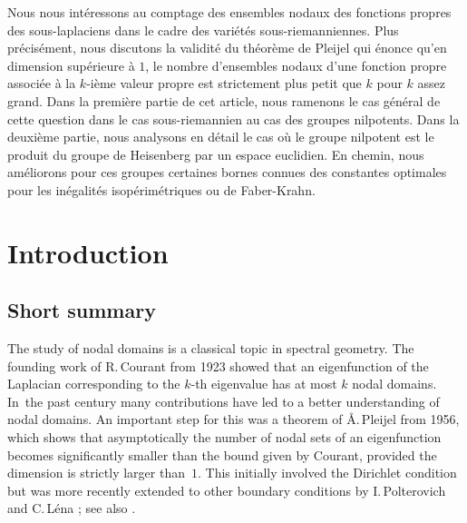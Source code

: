 \documentclass[JEP,XML,SOM,Unicode,published]{cedram}
\theoremstyle{definition}
\newcommand{\1}{\mathbbm{1}}
\begin{document}


\begin{altabstract}
Nous nous intéressons au comptage des ensembles nodaux des fonctions propres des sous-laplaciens dans le cadre des variétés sous-riemanniennes. Plus précisément, nous discutons la validité du théorème de Pleijel qui énonce qu'en dimension supérieure à $1$, le nombre d'ensembles nodaux d'une fonction propre associée à la $k$-ième valeur propre est strictement plus petit que $k$ pour $k$ assez grand.
Dans la première partie de cet article, nous ramenons le cas général de cette question dans le cas sous-riemannien au cas des groupes nilpotents.
Dans la deuxième partie, nous analysons en détail le cas où le groupe nilpotent est le produit du groupe de Heisenberg par un espace euclidien. En chemin, nous améliorons pour ces groupes certaines bornes connues des constantes optimales pour les inégalités isopérimétriques ou de Faber-Krahn.
\end{altabstract}

\maketitle
\vspace*{-\baselineskip}
\tableofcontents
\mainmatter

\vspace*{-3\baselineskip}
\mbox{}
\section{Introduction}\label{s0}

\subsection{Short summary}
The study of nodal domains is a classical topic in spectral geometry. The founding work of R.\,Courant \cite{CH} from 1923 showed that an eigenfunction of the Laplacian corresponding to the $k$-th eigenvalue has at most $k$ nodal domains. In~the past century many contributions have led to a better understanding of nodal domains. An important step for this was a theorem of \AA.\,Pleijel \cite{Pl} from 1956, which shows that asymptotically the number of nodal sets of an eigenfunction becomes significantly smaller than the bound given by Courant, provided the dimension is strictly larger than~$1$. This initially involved the Dirichlet condition but was more recently extended to other boundary conditions by I.\,Polterovich \cite{Po} and C.\,Léna \cite{Le}; see also \cite{DFV}.
\end{document}
